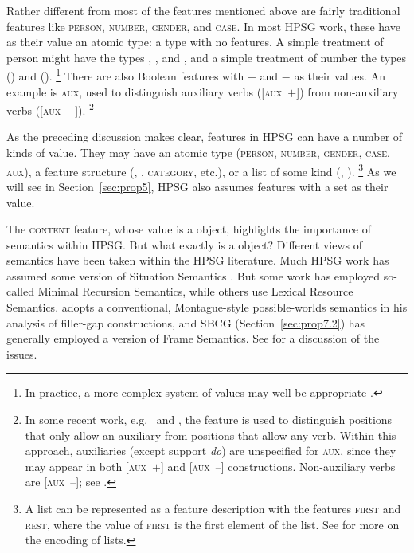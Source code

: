 \documentclass[output=paper,biblatex,babelshorthands,newtxmath,draftmode,colorlinks,citecolor=brown]{langscibook}
\begin{document}
Rather different from most of the features mentioned above are fairly traditional features like
\textsc{person, number, gender}, and \textsc{case}. In most HPSG work, these have as their value an
atomic type: a type with no features. A simple treatment of person might have the
types , , and , and a simple treatment of number the types
 () and  ().%
%
\footnote{In practice, a more complex system of values may well be appropriate \citep[Section~3]{Flickinger2000a}.}
%
There are also Boolean features with $+$ and $-$ as their values. An example is \textsc{aux}, used
to distinguish auxiliary verbs ([\textsc{aux}~$+$]) from non-auxiliary verbs ([\textsc{aux}~$-$]).%
%
\footnote{In some recent work, e.g.\ \citet[157--162]{Sag2012a} and \citet{Sag2020a}, the feature is
  used to distinguish positions that only allow an auxiliary from positions that allow any
  verb. Within this approach, auxiliaries (except support \emph{do}) are unspecified for
  \textsc{aux}, since they may appear in both [\textsc{aux}~$+$] and [\textsc{aux}~$–$]
  constructions. Non-auxiliary verbs are [\textsc{aux}~$–$]; see
  .} 
%

As the preceding discussion makes clear, features in HPSG can have a number of kinds of value. They
may have an atomic type (\textsc{person}, \textsc{number}, \textsc{gender}, \textsc{case},
\textsc{aux}), a feature structure (\synsem, \local, \textsc{category}, etc.), or a list of some
kind (\subj, \comps).%
%
\footnote{A list can be represented as a feature description with the features \textsc{first} and
  \textsc{rest}, where the value of \textsc{first} is the first element of the list. See
  \crossrefchapterw[\page \pageref{page-list-encoding}]{formal-background} for more on the encoding
  of lists.} 
%
As we will see in Section~\ref{sec:prop5}, HPSG also assumes features with a set as their value.

\largerpage
{\sloppypar
The \textsc{content} feature, whose value is a  object, highlights the importance of
semantics within HPSG. But what exactly is a  object? Different views of semantics
have been taken within the HPSG literature. Much HPSG work has assumed some version of Situation
Semantics \citep{BP83a}. But some work has employed so-called Minimal
Recursion Semantics\indexmrs \citep*{CFPS2005a}, while others use Lexical Resource
Semantics\indexlrs \citep{RS2004a-u}. \citet[501]{Sag2010b} adopts a
conventional, Montague-style possible-worlds semantics \citep{Montague74a-ed} in his analysis of
 filler-gap constructions, and SBCG (Section~\ref{sec:prop7.2}) has generally employed a
version of Frame Semantics. See  for a discussion of the issues.
}
\end{document}
